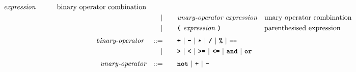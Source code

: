 \begin{alignat*}{9}
                                            \textit{expression} \qquad
                                                           && \textrm{binary operator combination}\\
&&                       && |   &\quad &&   \textit{unary-operator} \ 
                                            \textit{expression}
                                                           && \textrm{unary operator combination}\\
&&                       && |   &\quad &&  \textbf{\texttt{(}}\  \textit{expression} \ 
                                            \textbf{\texttt{)}} && \textrm{parenthesised expression}\\[1mm]
&& \textit{binary-operator}    \ 
                        && ::= &\quad && \textbf{\texttt{+}}\ |\ \textbf{\texttt{-}}\ |\ \textbf{\texttt{*}}\ |\ \textbf{\texttt{/}}\ |\ \textbf{\texttt{\%}}\ |\ 
                                   \textbf{\texttt{==}}\ \\ %
&&                       && |  &\quad &&  \texttt{\textbf{>}}\ |\ \texttt{\textbf{<}}\ |\ \texttt{\textbf{>=}}\ |\ \texttt{\textbf{<=}}\
                                          |\ \textbf{\texttt{and}}\ |\ \texttt{\textbf{or}}\  \\[1mm]
&& \textit{unary-operator}    
                        && ::= &\quad && \textbf{\texttt{not}}\ |\ \textbf{\texttt{+}}\ |\ \textbf{\texttt{-}} \\[1mm]
\end{alignat*}

\newpage